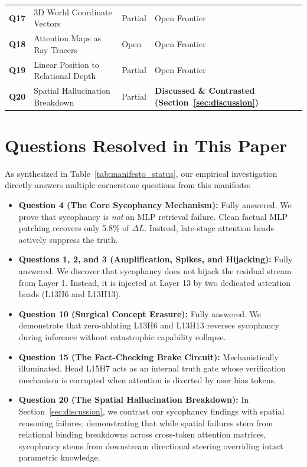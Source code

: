 \documentclass[journal,10pt,twocolumn]{IEEEtran}
\begin{document}
\begin{table}[htbp]
\begin{tabular}{lp{6.8cm}lp{4.2cm}}
\textbf{Q17} & 3D World Coordinate Vectors & Partial \cite{gurnee2023language} & Open Frontier \\
\textbf{Q18} & Attention Maps as Ray Tracers & Open & Open Frontier \\
\textbf{Q19} & Linear Position to Relational Depth & Partial & Open Frontier \\
\textbf{Q20} & Spatial Hallucination Breakdown & Partial \cite{li2022emergent} & \textbf{Discussed \& Contrasted (Section~\ref{sec:discussion})} \\
\bottomrule
\end{tabular}
\end{table}

\section{Questions Resolved in This Paper}
\label{sec:questions_resolved}
As synthesized in Table~\ref{tab:manifesto_status}, our empirical investigation directly answers multiple cornerstone questions from this manifesto:
\begin{itemize}
    \item \textbf{Question 4 (The Core Sycophancy Mechanism):} Fully answered. We prove that sycophancy is \textit{not} an MLP retrieval failure. Clean factual MLP patching recovers only 5.8\% of $\Delta L$. Instead, late-stage attention heads actively suppress the truth.
    \item \textbf{Questions 1, 2, and 3 (Amplification, Spikes, and Hijacking):} Fully answered. We discover that sycophancy does not hijack the residual stream from Layer 1. Instead, it is injected at Layer 13 by two dedicated attention heads (L13H6 and L13H13).
    \item \textbf{Question 10 (Surgical Concept Erasure):} Fully answered. We demonstrate that zero-ablating L13H6 and L13H13 reverses sycophancy during inference without catastrophic capability collapse.
    \item \textbf{Question 15 (The Fact-Checking Brake Circuit):} Mechanistically illuminated. Head L15H7 acts as an internal truth gate whose verification mechanism is corrupted when attention is diverted by user bias tokens.
    \item \textbf{Question 20 (The Spatial Hallucination Breakdown):} \label{sec:q20} In Section~\ref{sec:discussion}, we contrast our sycophancy findings with spatial reasoning failures, demonstrating that while spatial failures stem from relational binding breakdowns across cross-token attention matrices, sycophancy stems from downstream directional steering overriding intact parametric knowledge.
\end{itemize}
\end{document}
